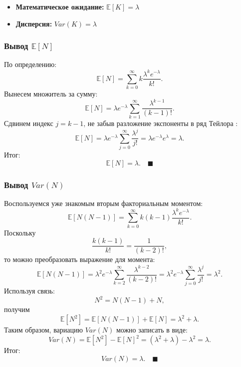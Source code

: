 \documentclass[
  russian,
  12pt,
  a4paper,
  a4paper,
  openany]{scrbook}
\begin{document}
\begin{itemize}
\item
  \textbf{Математическое ожидание:} \(\mathbb{E}[K]=\lambda\)
\item
  \textbf{Дисперсия:} \(Var(K)=\lambda\)
\end{itemize}

\begin{bookderivation}

\subsubsection{\texorpdfstring{\textbf{Вывод}
\(\mathbb{E}[N]\)}{Вывод \textbackslash mathbb\{E\}{[}N{]}}}\label{ux432ux44bux432ux43eux434-mathbben}

По определению:
\[\mathbb{E}[N]=\sum_{k=0}^\infty k\frac{\lambda^k e^{-\lambda}}{k!}.\]
Вынесем множитель за сумму:
\[\mathbb{E}[N]=\lambda e^{-\lambda}\sum_{k=1}^\infty \frac{\lambda^{k-1} }{(k-1)!}.\]
Сдвинем индекс \(j=k-1\), не забыв разложение экспоненты в ряд Тейлора :
\[\mathbb{E}[N]=\lambda e^{-\lambda}\sum_{j=0}^\infty \frac{\lambda^{j} }{j!}=\lambda e^{-\lambda}e^{\lambda}=\lambda.\]
Итог: \[\mathbb{E}[N]=\lambda. \quad \blacksquare\]

\end{bookderivation}

\begin{bookderivation}

\subsubsection{\texorpdfstring{\textbf{Вывод}
\(Var(N)\)}{Вывод Var(N)}}\label{ux432ux44bux432ux43eux434-varn}

Воспользуемся уже знакомым вторым факториальным моментом:
\[\mathbb{E}[N(N-1)]=\sum_{k=0}^\infty k(k-1)\frac{\lambda^k e^{-\lambda}}{k!}.\]
Поскольку \[\frac{k(k-1)}{k!}=\frac{1}{(k-2)!},\] то можно преобразовать
выражение для момента:
\[\mathbb{E}[N(N-1)]=\lambda^2 e^{-\lambda}\sum_{k=2}^\infty \frac{\lambda^{k-2} }{(k-2)!}=\lambda^2 e^{-\lambda}\sum_{j=0}^\infty \frac{\lambda^{j} }{j!}=\lambda^2.\]
Используя связь: \[N^2=N(N-1)+N,\] получим
\[\mathbb{E}[N^2]=\mathbb{E}[N(N-1)]+\mathbb{E}[N]=\lambda^2+\lambda.\]
Таким образом, вариацию \(Var(N)\) можно записать в виде:
\[Var(N)=\mathbb{E}[N^2]-\mathbb{E}[N]^2=(\lambda^2+\lambda)-\lambda^2=\lambda.\]
Итог: \[Var(N)=\lambda. \quad \blacksquare\]

\end{bookderivation}
\end{document}
